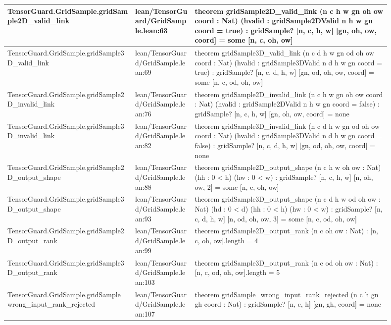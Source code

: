 \documentclass[10pt]{article}
\begin{document}
\begin{longtable}{|p{0.30\linewidth}|p{0.14\linewidth}|p{0.46\linewidth}|}
\hline
TensorGuard.GridSample.gridSample2D\_valid\_link & lean/TensorGuard/GridSample.lean:63 & theorem gridSample2D\_valid\_link (n c h w gn oh ow coord : Nat) (hvalid : gridSample2DValid n h w gn coord = true) : gridSample? [n, c, h, w] [gn, oh, ow, coord] = some [n, c, oh, ow] \\
\hline
TensorGuard.GridSample.gridSample3D\_valid\_link & lean/TensorGuard/GridSample.lean:69 & theorem gridSample3D\_valid\_link (n c d h w gn od oh ow coord : Nat) (hvalid : gridSample3DValid n d h w gn coord = true) : gridSample? [n, c, d, h, w] [gn, od, oh, ow, coord] = some [n, c, od, oh, ow] \\
\hline
TensorGuard.GridSample.gridSample2D\_invalid\_link & lean/TensorGuard/GridSample.lean:76 & theorem gridSample2D\_invalid\_link (n c h w gn oh ow coord : Nat) (hvalid : gridSample2DValid n h w gn coord = false) : gridSample? [n, c, h, w] [gn, oh, ow, coord] = none \\
\hline
TensorGuard.GridSample.gridSample3D\_invalid\_link & lean/TensorGuard/GridSample.lean:82 & theorem gridSample3D\_invalid\_link (n c d h w gn od oh ow coord : Nat) (hvalid : gridSample3DValid n d h w gn coord = false) : gridSample? [n, c, d, h, w] [gn, od, oh, ow, coord] = none \\
\hline
TensorGuard.GridSample.gridSample2D\_output\_shape & lean/TensorGuard/GridSample.lean:88 & theorem gridSample2D\_output\_shape (n c h w oh ow : Nat) (hh : 0 < h) (hw : 0 < w) : gridSample? [n, c, h, w] [n, oh, ow, 2] = some [n, c, oh, ow] \\
\hline
TensorGuard.GridSample.gridSample3D\_output\_shape & lean/TensorGuard/GridSample.lean:93 & theorem gridSample3D\_output\_shape (n c d h w od oh ow : Nat) (hd : 0 < d) (hh : 0 < h) (hw : 0 < w) : gridSample? [n, c, d, h, w] [n, od, oh, ow, 3] = some [n, c, od, oh, ow] \\
\hline
TensorGuard.GridSample.gridSample2D\_output\_rank & lean/TensorGuard/GridSample.lean:99 & theorem gridSample2D\_output\_rank (n c oh ow : Nat) : [n, c, oh, ow].length = 4 \\
\hline
TensorGuard.GridSample.gridSample3D\_output\_rank & lean/TensorGuard/GridSample.lean:103 & theorem gridSample3D\_output\_rank (n c od oh ow : Nat) : [n, c, od, oh, ow].length = 5 \\
\hline
TensorGuard.GridSample.gridSample\_wrong\_input\_rank\_rejected & lean/TensorGuard/GridSample.lean:107 & theorem gridSample\_wrong\_input\_rank\_rejected (n c h gn gh coord : Nat) : gridSample? [n, c, h] [gn, gh, coord] = none \\

\end{longtable}
\end{document}
